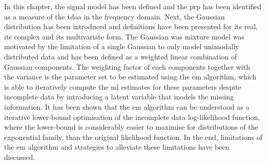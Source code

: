 \bigskip

In this chapter, the signal model has been defined and the \gls{prp} has been identified as a measure of the \gls{tdoa} in the frequency domain. Next, the Gaussian distribution has been introduced and definitions have been presented for its real, its complex and its multivariate form. The Gaussian was mixture model was motivated by the limitation of a single Gaussian to only model unimodally distributed data and has been defined as a weighted linear combination of Gaussian components. The weighting factor of each components together with the variance is the parameter set to be estimated using the \gls{em} algorithm, which is able to iteratively compute the \gls{ml} estimates for these parameters despite incomplete data by introducing a latent variable that models the missing information. It has been shown that the \gls{em} algorithm can be understood as a iterative lower-bound optimisation of the incomplete data log-likelihood function, where the lower-bound is considerably easier to maximise for distributions of the exponential family, than the original likelihood function. In the end, limitations of the \gls{em} algorithm and strategies to alleviate these limitations have been discussed.